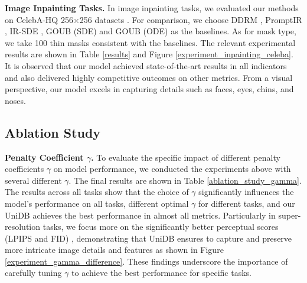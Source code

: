 \textbf{Image Inpainting Tasks.}
In image inpainting tasks, we evaluated our methods on CelebA-HQ 256$\times$256 datasets \cite{karras2018progressivegrowinggansimproved}. For comparison, we choose DDRM \cite{DDRM}, PromptIR \cite{PromptIR}, IR-SDE \cite{IRSDE}, GOUB (SDE) \cite{yue2024imagerestorationgeneralizedornsteinuhlenbeck} and GOUB (ODE) \cite{yue2024imagerestorationgeneralizedornsteinuhlenbeck} as the baselines. As for mask type, we take 100 thin masks consistent with the baselines. The relevant experimental results are shown in Table \ref{results} and Figure \ref{experiment_inpainting_celeba}. It is observed that our model achieved state-of-the-art results in all indicators and also delivered highly competitive outcomes on other metrics. From a visual perspective, our model excels in capturing details such as faces, eyes, chins, and noses.



\subsection{Ablation Study}


\textbf{Penalty Coefficient $\gamma$.} To evaluate the specific impact of different penalty coefficients $\gamma$ on model performance, we conducted the experiments above with several different $\gamma$. The final results are shown in Table \ref{ablation_study_gamma}. The results across all tasks show that the choice of $\gamma$ significantly influences the model's performance on all tasks, different optimal $\gamma$ for different tasks, and our UniDB achieves the best performance in almost all metrics. Particularly in super-resolution tasks, we focus more on the significantly better perceptual scores (LPIPS and FID) \cite{IRSDE}, demonstrating that UniDB ensures to capture and preserve more intricate image details and features as shown in Figure \ref{experiment_gamma_difference}. These findings underscore the importance of carefully tuning $\gamma$ to achieve the best performance for specific tasks.




